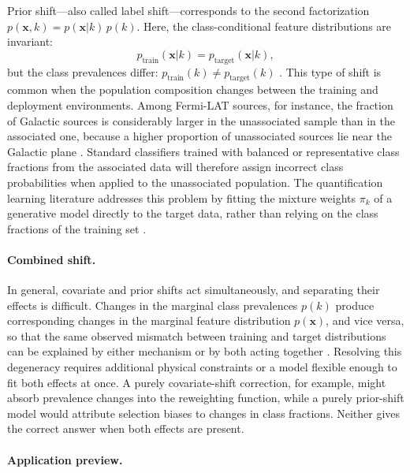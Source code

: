 Prior shift---also called label shift---corresponds to the second factorization $p(\mathbf{x}, k) = p(\mathbf{x}|k)\,p(k)$.
Here, the class-conditional feature distributions are invariant:
\begin{equation}
	p_{\text{train}}(\mathbf{x}|k) = p_{\text{target}}(\mathbf{x}|k),
	\label{eq:prior_shift}
\end{equation}
but the class prevalences differ: $p_{\text{train}}(k) \neq p_{\text{target}}(k)$ \cite{MorenoTorres2012AUV}.
This type of shift is common when the population composition changes between the training and deployment environments.
Among Fermi-LAT sources, for instance, the fraction of Galactic sources is considerably larger in the unassociated sample than in the associated one, because a higher proportion of unassociated sources lie near the Galactic plane \cite{2023RASTI...2..735M}.
Standard classifiers trained with balanced or representative class fractions from the associated data will therefore assign incorrect class probabilities when applied to the unassociated population.
The quantification learning literature \cite{10.1145/3117807_Gonzalez_quantification} addresses this problem by fitting the mixture weights $\pi_k$ of a generative model directly to the target data, rather than relying on the class fractions of the training set \cite{10.1162/089976602753284446_Saerens,2024arXiv240100490M}.

\paragraph{Combined shift.}

In general, covariate and prior shifts act simultaneously, and separating their effects is difficult.
Changes in the marginal class prevalences $p(k)$ produce corresponding changes in the marginal feature distribution $p(\mathbf{x})$, and vice versa, so that the same observed mismatch between training and target distributions can be explained by either mechanism or by both acting together \cite{MorenoTorres2012AUV}.
Resolving this degeneracy requires additional physical constraints or a model flexible enough to fit both effects at once.
A purely covariate-shift correction, for example, might absorb prevalence changes into the reweighting function, while a purely prior-shift model would attribute selection biases to changes in class fractions.
Neither gives the correct answer when both effects are present.

\paragraph{Application preview.}

